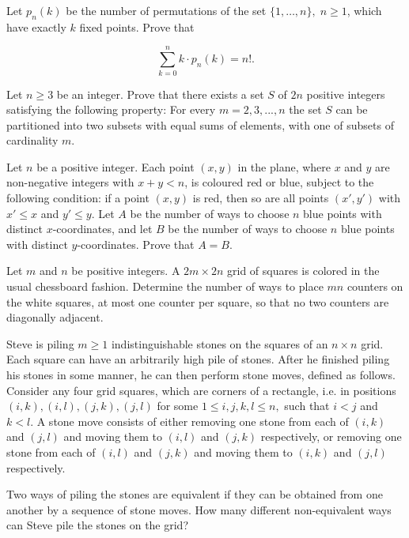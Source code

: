 \documentclass[mast]{lucky}
\begin{document}


\begin{req}[IMO 1987/1]{3}
Let $p_n (k)$ be the number of permutations of the set $\{ 1, \ldots , n \} , \; n \ge 1$, which have exactly $k$ fixed points. Prove that

\[\sum_{k=0}^{n} k \cdot p_n (k) = n!.\]
\end{req}

\begin{req}[AIME 1994/11]{6}

\end{req}

\begin{prob}[ISL 2018/C1]{9}
Let $n\geq 3$ be an integer. Prove that there exists a set $S$ of $2n$ positive integers satisfying the following property: For every $m=2,3,...,n$ the set $S$ can be partitioned into two subsets with equal sums of elements, with one of subsets of cardinality $m.$
\end{prob}

\begin{prob}[IMO 2002/1]{9}
Let $n$ be a positive integer. Each point $(x,y)$ in the plane, where $x$ and $y$ are non-negative integers with $x+y<n$, is coloured red or blue, subject to the following condition: if a point $(x,y)$ is red, then so are all points $(x',y')$ with $x'\leq x$ and $y'\leq y$. Let $A$ be the number of ways to choose $n$ blue points with distinct $x$-coordinates, and let $B$ be the number of ways to choose $n$ blue points with distinct $y$-coordinates. Prove that $A=B$.
\end{prob}

\begin{prob}[CMO 2019/3]{13}
Let $m$ and $n$ be positive integers. A $2m\times 2n$ grid of squares is colored in the usual chessboard fashion. Determine the number of ways to place $mn$ counters on the white squares, at most one counter per square, so that no two counters are diagonally adjacent.
\end{prob}

\begin{prob}[USAMO 2015/4]{13}
Steve is piling $m \geq 1$ indistinguishable stones on the squares of an $n \times n$ grid. Each square can have an arbitrarily high pile of stones. After he finished piling his stones in some manner, he can then perform stone moves, defined as follows. Consider any four grid squares, which are corners of a rectangle, i.e. in positions $(i, k),(i, l),(j, k),(j, l)$ for some $1 \leq i, j, k, l \leq n,$ such that $i<j$ and $k<l .$ A stone move consists of either removing one stone from each of $(i, k)$ and $(j, l)$ and moving them to $(i, l)$ and $(j, k)$ respectively, or removing one stone from each of $(i, l)$ and $(j, k)$ and moving them to $(i, k)$ and $(j, l)$ respectively.

Two ways of piling the stones are equivalent if they can be obtained from one another by a sequence of stone moves. How many different non-equivalent ways can Steve pile the stones on the grid?
\end{prob}
\end{document}
